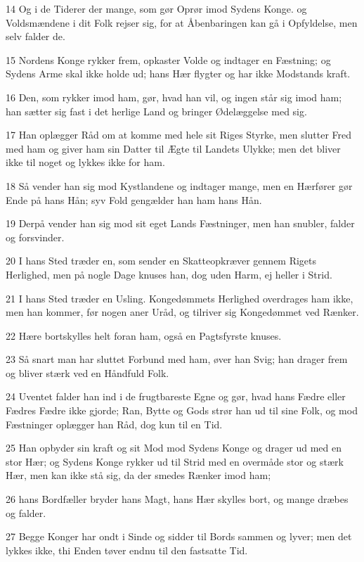 \par 14 Og i de Tiderer der mange, som gør Oprør imod Sydens Konge. og Voldsmændene i dit Folk rejser sig, for at Åbenbaringen kan gå i Opfyldelse, men selv falder de.
\par 15 Nordens Konge rykker frem, opkaster Volde og indtager en Fæstning; og Sydens Arme skal ikke holde ud; hans Hær flygter og har ikke Modstands kraft.
\par 16 Den, som rykker imod ham, gør, hvad han vil, og ingen står sig imod ham; han sætter sig fast i det herlige Land og bringer Ødelæggelse med sig.
\par 17 Han oplægger Råd om at komme med hele sit Riges Styrke, men slutter Fred med ham og giver ham sin Datter til Ægte til Landets Ulykke; men det bliver ikke til noget og lykkes ikke for ham.
\par 18 Så vender han sig mod Kystlandene og indtager mange, men en Hærfører gør Ende på hans Hån; syv Fold gengælder han ham hans Hån.
\par 19 Derpå vender han sig mod sit eget Lands Fæstninger, men han snubler, falder og forsvinder.
\par 20 I hans Sted træder en, som sender en Skatteopkræver gennem Rigets Herlighed, men på nogle Dage knuses han, dog uden Harm, ej heller i Strid.
\par 21 I hans Sted træder en Usling. Kongedømmets Herlighed overdrages ham ikke, men han kommer, før nogen aner Uråd, og tilriver sig Kongedømmet ved Rænker.
\par 22 Hære bortskylles helt foran ham, også en Pagtsfyrste knuses.
\par 23 Så snart man har sluttet Forbund med ham, øver han Svig; han drager frem og bliver stærk ved en Håndfuld Folk.
\par 24 Uventet falder han ind i de frugtbareste Egne og gør, hvad hans Fædre eller Fædres Fædre ikke gjorde; Ran, Bytte og Gods strør han ud til sine Folk, og mod Fæstninger oplægger han Råd, dog kun til en Tid.
\par 25 Han opbyder sin kraft og sit Mod mod Sydens Konge og drager ud med en stor Hær; og Sydens Konge rykker ud til Strid med en overmåde stor og stærk Hær, men kan ikke stå sig, da der smedes Rænker imod ham;
\par 26 hans Bordfæller bryder hans Magt, hans Hær skylles bort, og mange dræbes og falder.
\par 27 Begge Konger har ondt i Sinde og sidder til Bords sammen og lyver; men det lykkes ikke, thi Enden tøver endnu til den fastsatte Tid.
